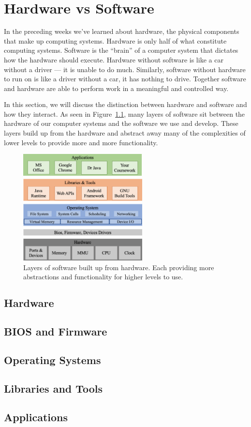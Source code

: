 \chapter{Hardware vs Software}

In the preceding weeks we've learned about hardware, the physical components that make up computing
systems. Hardware is only half of what constitute computing systems. Software is the ``brain'' of
a computer system that dictates how the hardware should execute. Hardware without software is like
a car without a driver --- it is unable to do much. Similarly, software without hardware to run on
is like a driver without a car, it has nothing to drive. Together software and hardware are able to
perform work in a meaningful and controlled way.

In this section, we will discuss the distinction between hardware and software and how they
interact. As seen in Figure~\ref{fig:hw_sw:layers}, many layers of software sit between the hardware of
our computer systems and the software we use and develop. These layers build up from the hardware and
abstract away many of the complexities of lower levels to provide more and more functionality.

\begin{figure}
\centering
\includegraphics[width=6.5cm]{images/software_layers.png}
\caption{Layers of software built up from hardware. Each providing more abstractions and functionality for higher levels to use.}
\label{fig:hw_sw:layers}
\end{figure}

\section{Hardware}


\section{BIOS and Firmware}

\section{Operating Systems}

\section{Libraries and Tools}

\section{Applications}
